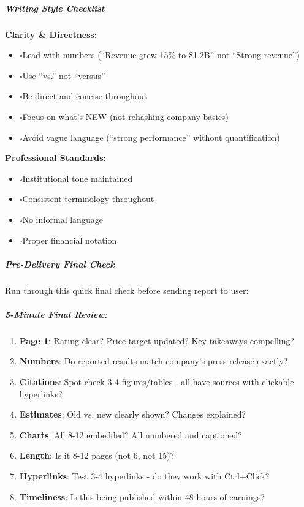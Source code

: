 \documentclass[11pt]{article}
\newcommand{\UncheckedBox}{$\square$}
\begin{document}
\subparagraph{Writing Style Checklist}\mbox{}\par

\textbf{Clarity \& Directness:}

\begin{itemize}[leftmargin=*,itemsep=2pt,topsep=2pt]
\item {} \UncheckedBox Lead with numbers (``Revenue grew 15\% to \$1.2B'' not ``Strong revenue'')
\item {} \UncheckedBox Use ``vs.'' not ``versus''
\item {} \UncheckedBox Be direct and concise throughout
\item {} \UncheckedBox Focus on what's NEW (not rehashing company basics)
\item {} \UncheckedBox Avoid vague language (``strong performance'' without quantification)
\end{itemize}

\textbf{Professional Standards:}

\begin{itemize}[leftmargin=*,itemsep=2pt,topsep=2pt]
\item {} \UncheckedBox Institutional tone maintained
\item {} \UncheckedBox Consistent terminology throughout
\item {} \UncheckedBox No informal language
\item {} \UncheckedBox Proper financial notation
\end{itemize}

\subparagraph{Pre-Delivery Final Check}\mbox{}\par

Run through this quick final check before sending report to user:


\subparagraph{5-Minute Final Review:}\mbox{}\par
\begin{enumerate}[leftmargin=*,itemsep=2pt,topsep=2pt]
\item {} \textbf{Page 1}: Rating clear? Price target updated? Key takeaways compelling?
\item {} \textbf{Numbers}: Do reported results match company's press release exactly?
\item {} \textbf{Citations}: Spot check 3-4 figures/tables - all have sources with clickable hyperlinks?
\item {} \textbf{Estimates}: Old vs. new clearly shown? Changes explained?
\item {} \textbf{Charts}: All 8-12 embedded? All numbered and captioned?
\item {} \textbf{Length}: Is it 8-12 pages (not 6, not 15)?
\item {} \textbf{Hyperlinks}: Test 3-4 hyperlinks - do they work with Ctrl+Click?
\item {} \textbf{Timeliness}: Is this being published within 48 hours of earnings?
\end{enumerate}
\end{document}
